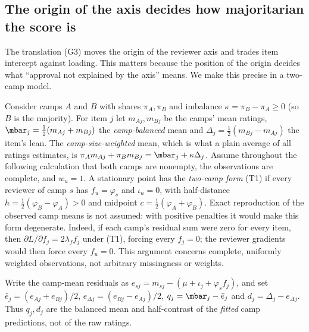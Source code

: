 \subsection{The origin of the axis decides how majoritarian the score is}

The translation (G3) moves the origin of the reviewer axis and trades item intercept against
loading. This matters because the position of the origin decides what ``approval not explained
by the axis'' means. We make this precise in a two-camp model.

Consider camps $A$ and $B$ with shares $\pi_A,\pi_B$ and imbalance
$\kappa=\pi_B-\pi_A\ge0$ (so $B$ is the majority). For item $j$ let $m_{Aj},m_{Bj}$ be the
camps' mean ratings, $\mbar_j=\tfrac12(m_{Aj}+m_{Bj})$ the \emph{camp-balanced} mean and
$\Delta_j=\tfrac12(m_{Bj}-m_{Aj})$ the item's lean. The \emph{camp-size-weighted} mean, which
is what a plain average of all ratings estimates, is $\pi_Am_{Aj}+\pi_Bm_{Bj}=\mbar_j+\kappa\Delta_j$.
Assume throughout the following calculation that both camps are nonempty, the observations
are complete, and $w_u=1$. A stationary point has the \emph{two-camp form} (T1) if every
reviewer of camp $s$ has $f_u=\varphi_s$ and $\iota_u=0$, with half-distance
$h=\tfrac12(\varphi_B-\varphi_A)>0$ and midpoint $c=\tfrac12(\varphi_A+\varphi_B)$.
Exact reproduction of the observed camp means is not assumed: with positive penalties it
would make this form degenerate. Indeed, if each camp's residual sum were zero for every item,
then $\partial L/\partial f_j=2\lambda_f f_j$ under (T1), forcing every $f_j=0$;
the reviewer gradients would then force every $f_u=0$. This argument concerns complete,
uniformly weighted observations, not arbitrary missingness or weights.

Write the camp-mean residuals as
$e_{sj}=m_{sj}-(\mu+\iota_j+\varphi_s f_j)$, and set
$\bar e_j=(e_{Aj}+e_{Bj})/2$, $e_{\Delta j}=(e_{Bj}-e_{Aj})/2$,
$q_j=\mbar_j-\bar e_j$ and $d_j=\Delta_j-e_{\Delta j}$.
Thus $q_j,d_j$ are the balanced mean and half-contrast of the \emph{fitted} camp predictions,
not of the raw ratings.

